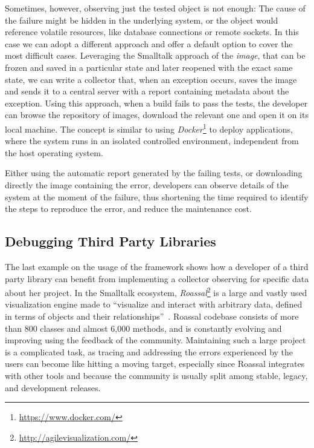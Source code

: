 Sometimes, however, observing just the tested object is not enough: The cause of the failure might be hidden in the underlying system, or the object would reference volatile resources, like database connections or remote sockets.
In this case we can adopt a different approach and offer a default option to cover the most difficult cases.
Leveraging the Smalltalk approach of the \emph{image}, that can be frozen and saved in a particular state and later reopened with the exact same state, we can write a collector that, when an exception occurs, saves the image and sends it to a central server with a report containing metadata about the exception. Using this approach, when a build fails to pass the tests, the developer can browse the repository of images, download the relevant one and open it on its local machine. The concept is similar to using \emph{Docker}\footnote{\url{https://www.docker.com/}} to deploy applications, where the system runs in an isolated controlled environment, independent from the host operating system.

Either using the automatic report generated by the failing tests, or downloading directly the image containing the error, developers can observe details of the system at the moment of the failure, thus shortening the time required to identify the steps to reproduce the error, and reduce the maintenance cost.

\subsection{Debugging Third Party Libraries}\label{sec:story-libraries}

The last example on the usage of the framework shows how a developer of a third party library can benefit from implementing a collector observing for specific data about her project.
In the Smalltalk ecosystem, \emph{Roassal}\footnote{\url{http://agilevisualization.com/}} is a large and vastly used visualization engine made to ``visualize and interact with arbitrary data, defined in terms of objects and their relationships''~\cite{Aray2013a}.
Roassal codebase consists of more than 800 classes and almost 6,000 methods, and is constantly evolving and improving using the feedback of the community.
Maintaining such a large project is a complicated task, as tracing and addressing the errors experienced by the users can become like hitting a moving target, especially since Roassal integrates with other tools and because the community is usually split among stable, legacy, and development releases.


